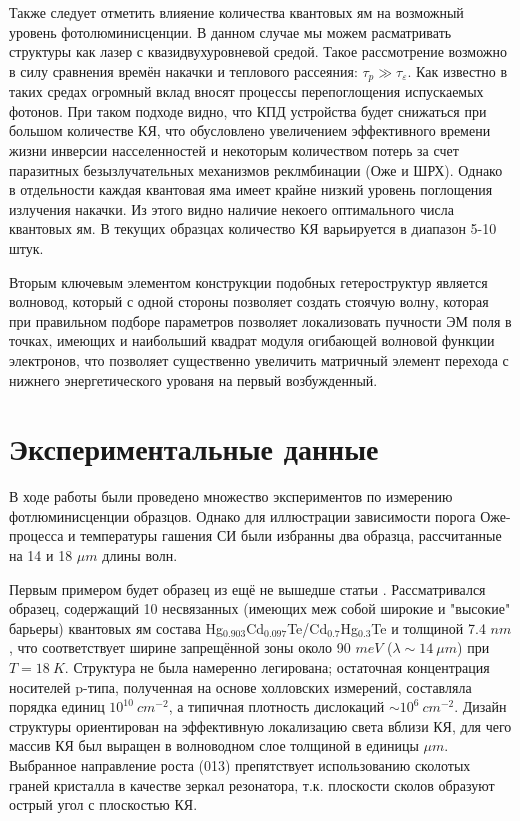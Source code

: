 \documentclass[../main.tex]{subfiles}
\begin{document}
    Также следует отметить влияение количества квантовых ям на возможный уровень фотолюминисценции. В данном случае мы можем расматривать
    структуры как лазер с квазидвухуровневой средой. Такое рассмотрение возможно в силу сравнения времён накачки и теплового рассеяния:
    $\tau_p \gg \tau_\varepsilon$. Как известно в таких средах огромный вклад вносят процессы перепоглощения испускаемых фотонов. При таком
    подходе видно, что КПД устройства будет снижаться при большом количестве КЯ, что обусловлено увеличением эффективного времени жизни инверсии
    насселенностей и некоторым количеством потерь за счет паразитных безызлучательных механизмов реклмбинации (Оже и ШРХ). Однако в отдельности
    каждая квантовая яма имеет крайне низкий уровень поглощения излучения накачки. Из этого видно наличие некоего
    оптимального числа квантовых ям. В текущих образцах количество КЯ варьируется в диапазон 5-10 штук.

    Вторым ключевым элементом конструкции подобных гетероструктур является волновод, который с одной стороны позволяет создать стоячую волну, которая
    при правильном подборе параметров позволяет локализовать пучности ЭМ поля в точках, имеющих и наибольший квадрат модуля огибающей волновой функции электронов, 
    что позволяет существенно увеличить матричный элемент перехода с нижнего энергетического урованя на первый возбужденный.

    \section{Экспериментальные данные}
    В ходе работы были проведено множество экспериментов по измерению фотлюминисценции образцов.
    Однако для иллюстрации зависимости порога Оже-процесса и температуры гашения СИ были избранны 
    два образца, рассчитанные на 14 и 18 $\mu m$ длины волн.

    Первым примером будет образец из ещё не вышедше статьи \cite{Utochkin:PTS:2019}. Рассматривался образец, содержащий 10 несвязанных
    (имеющих меж собой широкие и "высокие" барьеры) квантовых ям
    состава Hg${}_{0.903}$Cd${}_{0.097}$Te/Cd${}_0.7$Hg${}_{0.3}$Te и толщиной 7.4 $nm$, что соответствует ширине 
    запрещённой зоны около 90 $meV$ ($\lambda \sim 14~\mu m$) при $T = 18 ~K$. Структура не была намеренно легирована; остаточная концентрация 
    носителей p-типа, полученная на основе холловских измерений, составляла порядка единиц $10^10~cm^{-2}$, а типичная 
    плотность дислокаций $\sim 10^6~cm^{-2}$. Дизайн структуры ориентирован на эффективную локализацию света вблизи КЯ, для 
    чего массив КЯ был выращен в волноводном слое толщиной в единицы $\mu m$. Выбранное направление роста (013) 
    препятствует использованию сколотых граней кристалла в качестве зеркал резонатора, т.к. плоскости сколов образуют
    острый угол с плоскостью КЯ.
\end{document}
